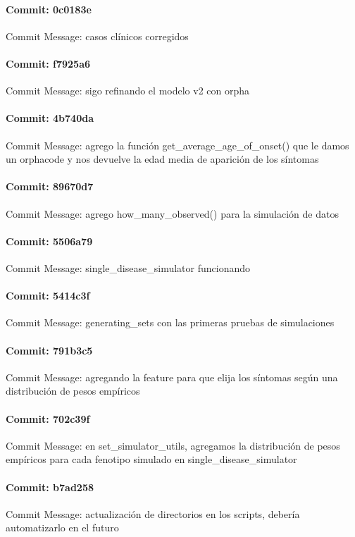 \documentclass{article}
\begin{document}
\paragraph{Commit: 0c0183e}
Commit Message: casos clínicos corregidos

\paragraph{Commit: f7925a6}
Commit Message: sigo refinando el modelo v2 con orpha

\paragraph{Commit: 4b740da}
Commit Message: agrego la función get_average_age_of_onset() que le damos un orphacode y nos devuelve la edad media de aparición de los síntomas

\paragraph{Commit: 89670d7}
Commit Message: agrego how_many_observed() para la simulación de datos

\paragraph{Commit: 5506a79}
Commit Message: single_disease_simulator funcionando

\paragraph{Commit: 5414c3f}
Commit Message: generating_sets con las primeras pruebas de simulaciones

\paragraph{Commit: 791b3c5}
Commit Message: agregando la feature para que elija los síntomas según una distribución de pesos empíricos

\paragraph{Commit: 702c39f}
Commit Message: en set_simulator_utils, agregamos la distribución de pesos empíricos para cada fenotipo simulado en single_disease_simulator

\paragraph{Commit: b7ad258}
Commit Message: actualización de directorios en los scripts, debería automatizarlo en el futuro
\end{document}
